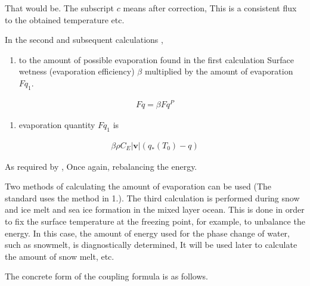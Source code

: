 That would be. The subscript \(c\) means after correction, This is a
consistent flux to the obtained temperature etc.

In the second and subsequent calculations ,

\begin{enumerate}
\def\labelenumi{\arabic{enumi}.}
\tightlist
\item
  to the amount of possible evaporation found in the first calculation
  Surface wetness (evaporation efficiency) \(\beta\) multiplied by the
  amount of evaporation \(Fq_1\).
\end{enumerate}

\begin{eqnarray}
        Fq = \beta Fq^P
\end{eqnarray}

\begin{enumerate}
\def\labelenumi{\arabic{enumi}.}
\setcounter{enumi}{1}
\tightlist
\item
  evaporation quantity \(Fq_1\) is
\end{enumerate}

\begin{eqnarray}
        \beta \rho C_E |\mathbf{v}| ( q_*(T_0) - q )
\end{eqnarray}

As required by , Once again, rebalancing the energy.

Two methods of calculating the amount of evaporation can be used (The
standard uses the method in 1.). The third calculation is performed
during snow and ice melt and sea ice formation in the mixed layer ocean.
This is done in order to fix the surface temperature at the freezing
point, for example, to unbalance the energy. In this case, the amount of
energy used for the phase change of water, such as snowmelt, is
diagnostically determined, It will be used later to calculate the amount
of snow melt, etc.

The concrete form of the coupling formula is as follows.

